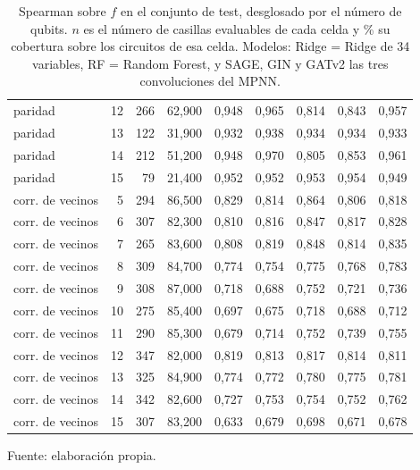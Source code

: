 \begin{table}[htbp]
{\begin{tabular}{@{}lrrrrrrrr@{}}
        paridad & 12 & 266 & 62,900 & 0,948 & 0,965 & 0,814 & 0,843 & 0,957 \\
        paridad & 13 & 122 & 31,900 & 0,932 & 0,938 & 0,934 & 0,934 & 0,933 \\
        paridad & 14 & 212 & 51,200 & 0,948 & 0,970 & 0,805 & 0,853 & 0,961 \\
        paridad & 15 & 79 & 21,400 & 0,952 & 0,952 & 0,953 & 0,954 & 0,949 \\
        corr. de vecinos & 5 & 294 & 86,500 & 0,829 & 0,814 & 0,864 & 0,806 & 0,818 \\
        corr. de vecinos & 6 & 307 & 82,300 & 0,810 & 0,816 & 0,847 & 0,817 & 0,828 \\
        corr. de vecinos & 7 & 265 & 83,600 & 0,808 & 0,819 & 0,848 & 0,814 & 0,835 \\
        corr. de vecinos & 8 & 309 & 84,700 & 0,774 & 0,754 & 0,775 & 0,768 & 0,783 \\
        corr. de vecinos & 9 & 308 & 87,000 & 0,718 & 0,688 & 0,752 & 0,721 & 0,736 \\
        corr. de vecinos & 10 & 275 & 85,400 & 0,697 & 0,675 & 0,718 & 0,688 & 0,712 \\
        corr. de vecinos & 11 & 290 & 85,300 & 0,679 & 0,714 & 0,752 & 0,739 & 0,755 \\
        corr. de vecinos & 12 & 347 & 82,000 & 0,819 & 0,813 & 0,817 & 0,814 & 0,811 \\
        corr. de vecinos & 13 & 325 & 84,900 & 0,774 & 0,772 & 0,780 & 0,775 & 0,781 \\
        corr. de vecinos & 14 & 342 & 82,600 & 0,727 & 0,753 & 0,754 & 0,752 & 0,762 \\
        corr. de vecinos & 15 & 307 & 83,200 & 0,633 & 0,679 & 0,698 & 0,671 & 0,678 \\
        \bottomrule
    \end{tabular}}

    \caption{Spearman sobre $f$ en el conjunto de test, desglosado por el número de qubits. $n$ es el número de casillas evaluables de cada celda y \% su cobertura sobre los circuitos de esa celda. Modelos: Ridge = Ridge de 34 variables, RF = Random Forest, y SAGE, GIN y GATv2 las tres convoluciones del MPNN.}
    \label{tab:v2_tamano_spearman_f}

    {\footnotesize Fuente: elaboración propia.}
\end{table}
